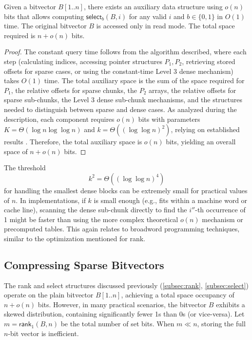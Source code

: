 \begin{theorem} \label{th:select}
    Given a bitvector $B[1..n]$, there exists an auxiliary data structure using $o(n)$ bits that allows computing $\textsf{select}_b(B, i)$ for any valid $i$ and $b \in \{0,1\}$ in $O(1)$ time. The original bitvector $B$ is accessed only in read mode. The total space required is $n + o(n)$ bits.
\end{theorem}
\begin{proof}
    The constant query time follows from the algorithm described, where each step (calculating indices, accessing pointer structures $P_1, P_2$, retrieving stored offsets for sparse cases, or using the constant-time Level 3 dense mechanism) takes $O(1)$ time. The total auxiliary space is the sum of the space required for $P_1$, the relative offsets for sparse chunks, the $P_2$ arrays, the relative offsets for sparse sub-chunks, the Level 3 dense sub-chunk mechanisms, and the structures needed to distinguish between sparse and dense cases. As analyzed during the description, each component requires $o(n)$ bits with parameters $K=\Theta(\log n \log \log n)$ and $k=\Theta((\log \log n)^2)$, relying on established results \cite{clark1997compact}. Therefore, the total auxiliary space is $o(n)$ bits, yielding an overall space of $n+o(n)$ bits.
\end{proof}

\begin{remark}
    The threshold
    \[k^2 = \Theta((\log \log n)^4)\]
    for handling the smallest dense blocks can be extremely small for practical values of $n$. In implementations, if $k$ is small enough (e.g., fits within a machine word or cache line), scanning the dense sub-chunk directly to find the $i''$-th occurrence of 1 might be faster than using the more complex theoretical $o(n)$ mechanism or precomputed tables. This again relates to broadword programming techniques, similar to the optimization mentioned for \textsf{rank}.
\end{remark}

\subsection{Compressing Sparse Bitvectors} \label{subsec:elias_fano_compression}

The \textsf{rank} and \textsf{select} structures discussed previously (\ref{subsec:rank}, \ref{subsec:select}) operate on the plain bitvector $B[1..n]$, achieving a total space occupancy of $n + o(n)$ bits. However, in many practical scenarios, the bitvector $B$ exhibits a skewed distribution, containing significantly fewer 1s than 0s (or vice-versa). Let $m = \textsf{rank}_1(B, n)$ be the total number of set bits. When $m \ll n$, storing the full $n$-bit vector is inefficient.


